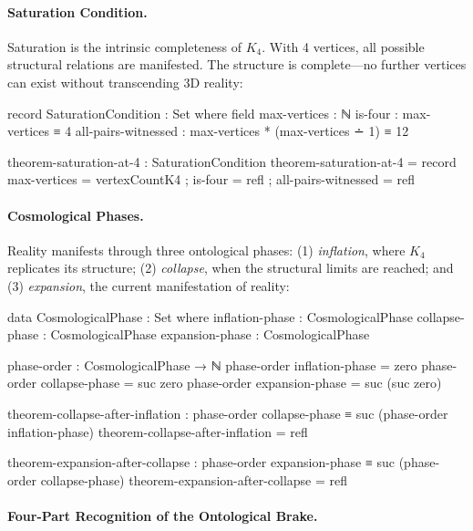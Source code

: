 \documentclass[11pt,a4paper]{book}
\begin{document}
\paragraph{Saturation Condition.}

Saturation is the intrinsic completeness of $K_4$. With 4 vertices, all possible structural relations are manifested. The structure is complete—no further vertices can exist without transcending 3D reality:

\begin{code}
record SaturationCondition : Set where
  field
    max-vertices    : ℕ
    is-four         : max-vertices ≡ 4
    all-pairs-witnessed : max-vertices * (max-vertices ∸ 1) ≡ 12

theorem-saturation-at-4 : SaturationCondition
theorem-saturation-at-4 = record
  { max-vertices = vertexCountK4
  ; is-four = refl
  ; all-pairs-witnessed = refl
  }
\end{code}

\paragraph{Cosmological Phases.}

Reality manifests through three ontological phases: (1) \emph{inflation}, where $K_4$ replicates its structure; (2) \emph{collapse}, when the structural limits are reached; and (3) \emph{expansion}, the current manifestation of reality:

\begin{code}
data CosmologicalPhase : Set where
  inflation-phase : CosmologicalPhase
  collapse-phase  : CosmologicalPhase
  expansion-phase : CosmologicalPhase

phase-order : CosmologicalPhase → ℕ
phase-order inflation-phase = zero
phase-order collapse-phase = suc zero
phase-order expansion-phase = suc (suc zero)

theorem-collapse-after-inflation : phase-order collapse-phase ≡ suc (phase-order inflation-phase)
theorem-collapse-after-inflation = refl

theorem-expansion-after-collapse : phase-order expansion-phase ≡ suc (phase-order collapse-phase)
theorem-expansion-after-collapse = refl
\end{code}

\paragraph{Four-Part Recognition of the Ontological Brake.}
\end{document}
